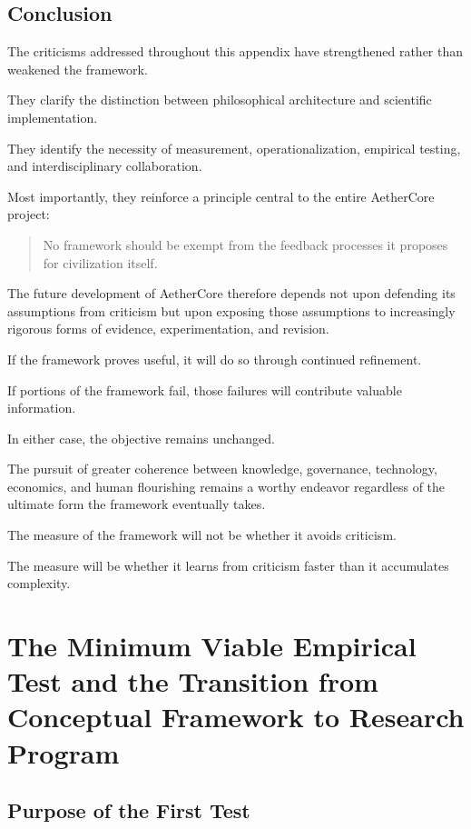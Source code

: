 \documentclass[12pt]{article}
\begin{document}
\subsection{Conclusion}

The criticisms addressed throughout this appendix have strengthened rather than weakened the framework.

They clarify the distinction between philosophical architecture and scientific implementation.

They identify the necessity of measurement, operationalization, empirical testing, and interdisciplinary collaboration.

Most importantly, they reinforce a principle central to the entire AetherCore project:

\begin{quote}
No framework should be exempt from the feedback processes it proposes for civilization itself.
\end{quote}

The future development of AetherCore therefore depends not upon defending its assumptions from criticism but upon exposing those assumptions to increasingly rigorous forms of evidence, experimentation, and revision.

If the framework proves useful, it will do so through continued refinement.

If portions of the framework fail, those failures will contribute valuable information.

In either case, the objective remains unchanged.

The pursuit of greater coherence between knowledge, governance, technology, economics, and human flourishing remains a worthy endeavor regardless of the ultimate form the framework eventually takes.

The measure of the framework will not be whether it avoids criticism.

The measure will be whether it learns from criticism faster than it accumulates complexity.

\section{The Minimum Viable Empirical Test and the Transition from Conceptual Framework to Research Program}

\subsection{Purpose of the First Test}
\end{document}
